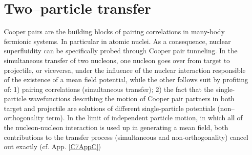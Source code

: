 
 \chapter{Two--particle transfer}\label{C7}
Cooper pairs are the building blocks of pairing correlations in many-body fermionic systems. In particular in atomic nuclei. As a consequence, nuclear superfluidity can be specifically probed through Cooper pair tunneling.
In the simultaneous transfer of two nucleons, one nucleon goes over from target to projectile, or viceversa, under the influence of the nuclear interaction
responsible of the existence of a mean field potential,  while the other follows suit by profiting of: 1) pairing correlations (simultaneous transfer); 
2) the fact that the single-particle wavefunctions describing the motion of Cooper pair partners in both target and projectile are solutions of different 
single-particle potentials (non--orthogonality term). 
In the limit of independent particle motion, in which all of the nucleon-nucleon interaction is used up in generating a mean field, both contributions
to the transfer process (simultaneous and non-orthogonality) cancel out exactly (cf. App. \ref{C7AppC})

